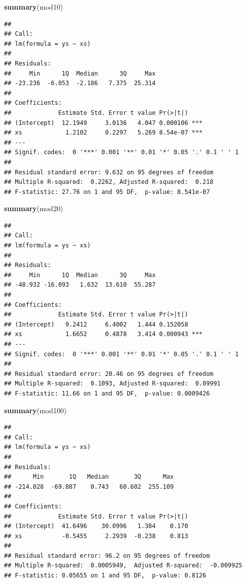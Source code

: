 \documentclass[
]{book}
\newenvironment{Shaded}{\begin{snugshade}}{\end{snugshade}}
\newcommand{\KeywordTok}[1]{\textcolor[rgb]{0.13,0.29,0.53}{\textbf{#1}}}
\newcommand{\NormalTok}[1]{#1}
\begin{document}
\begin{Shaded}
\begin{Highlighting}[]
\KeywordTok{summary}\NormalTok{(mod10)}
\end{Highlighting}
\end{Shaded}

\begin{verbatim}
## 
## Call:
## lm(formula = ys ~ xs)
## 
## Residuals:
##     Min      1Q  Median      3Q     Max 
## -23.236  -6.053  -2.186   7.375  25.314 
## 
## Coefficients:
##             Estimate Std. Error t value Pr(>|t|)    
## (Intercept)  12.1949     3.0136   4.047 0.000106 ***
## xs            1.2102     0.2297   5.269 8.54e-07 ***
## ---
## Signif. codes:  0 '***' 0.001 '**' 0.01 '*' 0.05 '.' 0.1 ' ' 1
## 
## Residual standard error: 9.632 on 95 degrees of freedom
## Multiple R-squared:  0.2262,	Adjusted R-squared:  0.218 
## F-statistic: 27.76 on 1 and 95 DF,  p-value: 8.541e-07
\end{verbatim}

\begin{Shaded}
\begin{Highlighting}[]
\KeywordTok{summary}\NormalTok{(mod20)}
\end{Highlighting}
\end{Shaded}

\begin{verbatim}
## 
## Call:
## lm(formula = ys ~ xs)
## 
## Residuals:
##     Min      1Q  Median      3Q     Max 
## -48.932 -16.093   1.632  13.610  55.287 
## 
## Coefficients:
##             Estimate Std. Error t value Pr(>|t|)    
## (Intercept)   9.2412     6.4002   1.444 0.152058    
## xs            1.6652     0.4878   3.414 0.000943 ***
## ---
## Signif. codes:  0 '***' 0.001 '**' 0.01 '*' 0.05 '.' 0.1 ' ' 1
## 
## Residual standard error: 20.46 on 95 degrees of freedom
## Multiple R-squared:  0.1093,	Adjusted R-squared:  0.09991 
## F-statistic: 11.66 on 1 and 95 DF,  p-value: 0.0009426
\end{verbatim}

\begin{Shaded}
\begin{Highlighting}[]
\KeywordTok{summary}\NormalTok{(mod100)}
\end{Highlighting}
\end{Shaded}

\begin{verbatim}
## 
## Call:
## lm(formula = ys ~ xs)
## 
## Residuals:
##      Min       1Q   Median       3Q      Max 
## -214.028  -69.887    0.743   60.602  255.109 
## 
## Coefficients:
##             Estimate Std. Error t value Pr(>|t|)
## (Intercept)  41.6496    30.0996   1.384    0.170
## xs           -0.5455     2.2939  -0.238    0.813
## 
## Residual standard error: 96.2 on 95 degrees of freedom
## Multiple R-squared:  0.0005949,	Adjusted R-squared:  -0.009925 
## F-statistic: 0.05655 on 1 and 95 DF,  p-value: 0.8126
\end{verbatim}
\end{document}
